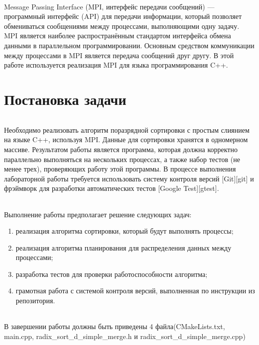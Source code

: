 \documentclass[12pt,a4paper]{article}
\begin{document}
\paragraph{}Message Passing Interface (MPI, интерфейс передачи сообщений) — программный интерфейс (API) для передачи информации, который позволяет обмениваться сообщениями между процессами, выполняющими одну задачу. MPI является наиболее распространённым стандартом интерфейса обмена данными в параллельном программировании. Основным средством коммуникации между процессами в MPI является передача сообщений друг другу. В этой работе используется реализация MPI для языка программирования C++.

\part*{Постановка задачи}
\paragraph{}Необходимо реализовать алгоритм поразрядной сортировки с простым слиянием на языке C++, используя MPI. Данные для сортировки хранятся в одномерном массиве. Результатом работы является программа, которая должна корректно параллельно выполняться на нескольких процессах, а также набор тестов (не менее трех), проверяющих работу этой программы. В процессе выполнения лабораторной работы требуется использовать систему контроля версий [Git][git] и фрэймворк для разработки автоматических тестов [Google Test][gtest].
\paragraph{}Выполнение работы предполагает решение следующих задач:
\begin{enumerate}
\item реализация алгоритма сортировки, который будут выполнять процессы;
\item реализация алгоритма планирования для распределения данных между процессами;
\item разработка тестов для проверки работоспособности алгоритма;
\item грамотная работа с системой контроля версий, выполненная по инструкции из репозитория.
\end{enumerate}
\paragraph{}В завершении работы должны быть приведены 4 файла(CMakeLists.txt, main.cpp, radix\_sort\_d\_simple\_merge.h и radix\_sort\_d\_simple\_merge.cpp)
\end{document}
